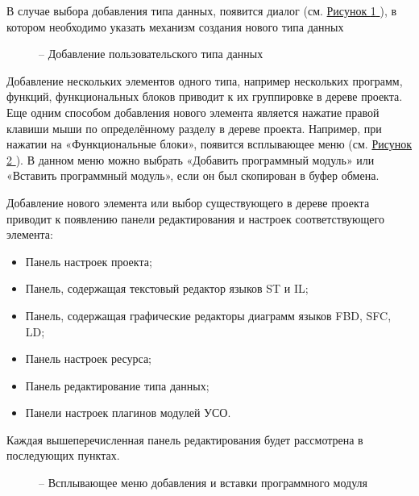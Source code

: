 \documentclass[letterpaper,10pt,russian]{sphinxmanual}
\begin{document}
В случае выбора добавления типа данных, появится диалог (см. \hyperref[usage_guide/ide_components:image27]{Рисунок \ref{usage_guide/ide_components:image27} }), в
котором необходимо указать механизм создания нового типа данных
\begin{figure}[htbp]
\centering
\capstart

\noindent{}
\caption{– Добавление пользовательского типа данных}\label{usage_guide/ide_components:image27}\end{figure}

Добавление нескольких элементов одного типа, например нескольких
программ, функций, функциональных блоков приводит к их группировке в
дереве проекта. Еще одним способом добавления нового элемента
является нажатие правой клавиши мыши по определённому разделу в
дереве проекта. Например, при нажатии на «Функциональные блоки»,
появится всплывающее меню (см. \hyperref[usage_guide/ide_components:image28]{Рисунок \ref{usage_guide/ide_components:image28} }). В данном меню можно выбрать
«Добавить программный модуль» или «Вставить программный модуль», если
он был скопирован в буфер обмена.

Добавление нового элемента или выбор существующего в дереве проекта
приводит к появлению панели редактирования и настроек соответствующего
элемента:
\begin{itemize}
\item {} 
Панель настроек проекта;

\item {} 
Панель, содержащая текстовый редактор языков ST и IL;

\item {} 
Панель, содержащая графические редакторы диаграмм языков FBD, SFC,
LD;

\item {} 
Панель настроек ресурса;

\item {} 
Панель редактирование типа данных;

\item {} 
Панели настроек плагинов модулей УСО.

\end{itemize}

Каждая вышеперечисленная панель редактирования будет рассмотрена в
последующих пунктах.
\begin{figure}[htbp]
\centering
\capstart

\noindent{}
\caption{– Всплывающее меню добавления и вставки программного модуля}\label{usage_guide/ide_components:image28}\end{figure}
\end{document}
